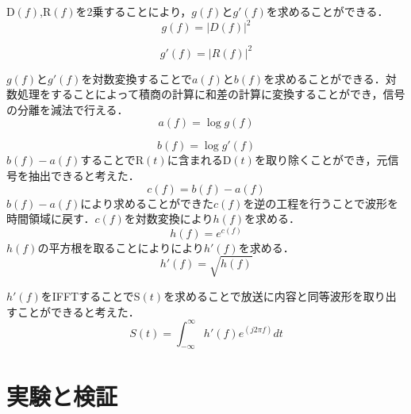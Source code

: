 \documentclass[a4j,11pt]{jsarticle}
\begin{document}
D$(f)$,R$(f)$を2乗することにより，$g(f)$と$g'(f)$を求めることができる．
{\Large
\begin{equation}
\label{提案手法最初}
  g(f) = |D(f)|^2
\end{equation}
}

{\Large
\begin{equation}
\label{提案手法最初}
  g'(f) = |R(f)|^2
\end{equation}
}

$g(f)$と$g'(f)$を対数変換することで$a(f)$と$b(f)$を求めることができる．対数処理をすることによって積商の計算に和差の計算に変換することができ，信号の分離を減法で行える．
{\Large
\begin{equation}
\label{提案手法最初}
  a(f) = \log g(f)
\end{equation}
}


{\Large
\begin{equation}
\label{提案手法最初}
  b(f) = \log g'(f)
\end{equation}
}
$b(f)-a(f)$することでR$(t)$に含まれるD$(t)$を取り除くことができ，元信号を抽出できると考えた．
{\Large
\begin{equation}
\label{提案手法最初}
  c(f) = b(f)-a(f)
\end{equation}
}
$b(f)-a(f)$により求めることができた$c(f)$を逆の工程を行うことで波形を時間領域に戻す．$c(f)$を対数変換により$h(f)$を求める．
{\Large
\begin{equation}
\label{提案手法最初}
  h(f) = e^{c(f)}
\end{equation}
}
$h(f)$の平方根を取ることによりにより$h'(f)$を求める．
{\Large
\begin{equation}
\label{提案手法最初}
  h'(f) =  \sqrt{h(f)}
\end{equation}
}

$h'(f)$をIFFTすることでS$(t)$を求めることで放送に内容と同等波形を取り出すことができると考えた．
{\Large
\begin{equation}
	\label{noref}
  S(t) =  \int^{\infty}_{-\infty}h'(f)e^{(j2\pi f)}dt 
\end{equation}
}


\newpage

\section{実験と検証}
\end{document}

